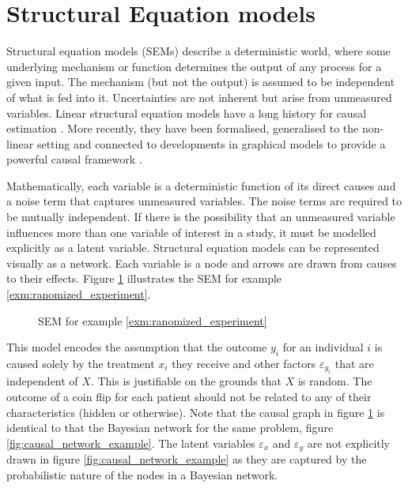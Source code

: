 \documentclass[11pt,a4paper,oneside]{book}
\theoremstyle{plain}
\theoremstyle{definition}
\let\epsilon\varepsilon
\begin{document}
\section{Structural Equation models}
\label{sec:SEM}

Structural equation models (SEMs) describe a deterministic world, where some underlying mechanism or function determines the output of any process for a given input. The mechanism (but not the output) is assumed to be independent of what is fed into it. Uncertainties are not inherent but arise from unmeasured variables. Linear structural equation models have a long history for causal estimation \cite {Wright1921,Haavelmo1943}. More recently, they have been formalised, generalised to the non-linear setting and connected to developments in graphical models to provide a powerful causal framework \citep{Pearl2000}.

Mathematically, each variable is a deterministic function of its direct causes and a noise term that captures unmeasured variables. The noise terms are required to be mutually independent. If there is the possibility that an unmeasured variable influences more than one variable of interest in a study, it must be modelled explicitly as a latent variable. Structural equation models can be represented visually as a network. Each variable is a node and arrows are drawn from causes to their effects. Figure \ref{fig:sem_randomized_treatment} illustrates the SEM for example \ref{exm:ranomized_experiment}.

\begin{figure}[h]
\centering
{}
\caption{SEM for example \ref{exm:ranomized_experiment}}
\label{fig:sem_randomized_treatment}
\end{figure}

This model encodes the assumption that the outcome $y_{i}$ for an individual $i$ is caused solely by the treatment $x_{i}$ they receive and other factors $\epsilon_{y_{i}}$ that are independent of $X$. This is justifiable on the grounds that $X$ is random. The outcome of a coin flip for each patient should not be related to any of their characteristics (hidden or otherwise). Note that the causal graph in figure \ref{fig:sem_randomized_treatment} is identical to that the Bayesian network for the same problem, figure \ref{fig:causal_network_example}. The latent variables $\epsilon_x$ and $\epsilon_y$ are not explicitly drawn in figure \ref{fig:causal_network_example} as they are captured by the probabilistic nature of the nodes in a Bayesian network.
\end{document}
